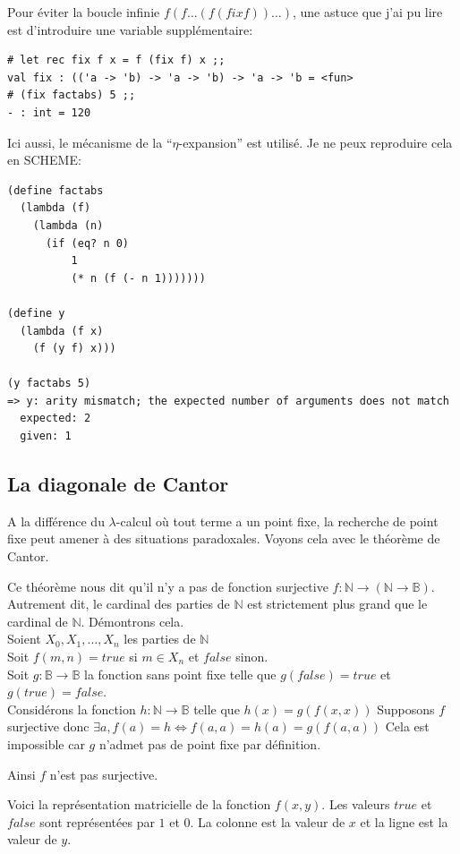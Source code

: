 \documentclass[11pt]{book}
\begin{document}
Pour éviter la boucle infinie $f(f\ldots(f (fix f))\ldots)$, 
une astuce que j'ai pu lire est d'introduire une variable supplémentaire:

\begin{Verbatim}
# let rec fix f x = f (fix f) x ;;
val fix : (('a -> 'b) -> 'a -> 'b) -> 'a -> 'b = <fun>
# (fix factabs) 5 ;;
- : int = 120
\end{Verbatim}
Ici aussi, le mécanisme de la ``$\eta$-expansion'' est utilisé.
Je ne peux reproduire cela en SCHEME:

\begin{Verbatim}
(define factabs
  (lambda (f)
    (lambda (n)
      (if (eq? n 0)
          1
          (* n (f (- n 1)))))))

(define y
  (lambda (f x)
    (f (y f) x)))

(y factabs 5)
=> y: arity mismatch; the expected number of arguments does not match 
  expected: 2
  given: 1
\end{Verbatim}

\subsection{La diagonale de Cantor} %
 A la différence du $\lambda$-calcul où tout terme a un point fixe, la recherche de point fixe
peut amener à des situations paradoxales.
Voyons cela avec le théorème  de Cantor.


Ce théorème nous dit qu'il n'y a pas de fonction surjective 
$f: \mathbb{N} \rightarrow ( \mathbb{N} \rightarrow \mathbb{B}) $.
Autrement dit, le cardinal des parties de $\mathbb{N}$ est strictement plus grand que le cardinal de $\mathbb{N}$.
Démontrons cela. \\
Soient $X_0, X_1, \ldots, X_n$ les parties de $\mathbb{N}$  \\
Soit $f(m,n) = true$ si $m \in X_n$ et $false$ sinon. \\
Soit $g :\mathbb{B} \rightarrow \mathbb{B}$ la fonction sans point fixe telle que $g(false)=true$ et $g(true)=false$. \\
Considérons la fonction $h: \mathbb{N} \rightarrow \mathbb{B}$ telle que $h(x) = g(f(x,x))$
Supposons $f$ surjective donc $\exists a, f(a)= h \Leftrightarrow  f(a,a) = h(a) = g(f(a,a))$ 
Cela est impossible car $g$ n'admet pas de point fixe par définition.

Ainsi $f$ n'est pas surjective. \qedsymbol
\vspace{0.5cm}

Voici la représentation matricielle de la fonction $f(x,y)$. Les valeurs $true$ et $false$ sont représentées par $1$ et $0$.
La colonne est la valeur de $x$ et la ligne est la valeur de $y$.
\end{document}
